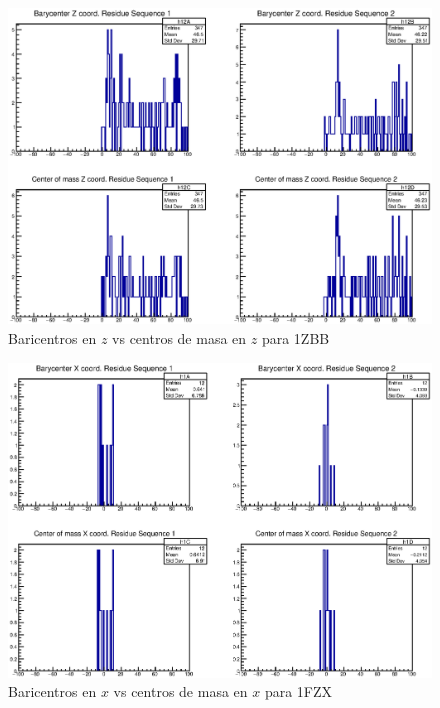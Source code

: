 \begin{figure}[htbp]
    \centering
    \includegraphics[width=1\linewidth]{./Figures/can3.eps}
  \caption[Baricentros en $z$ vs centros de masa en $z$ para 1ZBB]{Baricentros en $z$ vs centros de masa en $z$ para 1ZBB}
    \label{fig:canz}
\end{figure}




\begin{figure}[htbp]
    \centering
    \includegraphics[width=1.1\linewidth]{./Figures/1fzx.eps}
  \caption[Baricentros en $x$ vs centros de masa en $x$ para 1FZX]{Baricentros en $x$ vs centros de masa en $x$ para 1FZX}
    \label{fig:cax}
\end{figure}

